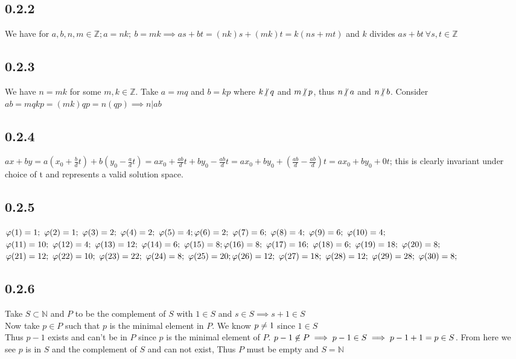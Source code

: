 \documentclass[11pt]{article}
\begin{document}
	\subsection*{0.2.2}
		We have for $a, b, n, m \in \mathbb{Z}; a = nk;\ b = mk \implies as + bt = (nk)s + (mk)t = k(ns + mt)$ and $k$ divides $as + bt \ \forall s,t \in \mathbb{Z}$
	\subsection*{0.2.3}
		We have $n = mk$ for some $m, k \in \mathbb{Z}$.  Take $a = mq$ and $b = kp$ where $k \centernot | q$ and $m \centernot | p$, thus $n \centernot | a$ and
		$n \centernot | b$.  Consider $ab = mqkp = (mk)qp = n(qp) \implies n | ab$
	\subsection*{0.2.4}
		$ax + by = a(x_0 + \frac{b}{d}t) + b(y_0 - \frac{a}{d}t) = ax_0 + \frac{ab}{d}t + by_0 - \frac{ab}{d}t = ax_0 + by_0 + (\frac{ab}{d} - \frac{ab}{d})t = ax_0 + by_0 + 			0t$; this is clearly invariant under choice of t and represents a valid solution space.
	\subsection*{0.2.5}
		$\varphi(1)=1;\ \varphi(2)=1;\ \varphi(3)=2;\ \varphi(4)=2;\ \varphi(5)=4;\\ \varphi(6)=2;\ \varphi(7)=6;\ \varphi(8)=4;\ \varphi(9)=6;\ \varphi(10)=4;$	\\
		$\varphi(11)=10;\ \varphi(12)=4;\ \varphi(13)=12;\ \varphi(14)=6;\ \varphi(15)=8;\\ \varphi(16)=8;\ \varphi(17)=16;\ \varphi(18)=6;\ \varphi(19)=18;\ \varphi(20)=8;$	\\
		$\varphi(21)=12;\ \varphi(22)=10;\ \varphi(23)=22;\ \varphi(24)=8;\ \varphi(25)=20;\\ \varphi(26)=12;\ \varphi(27)=18;\ \varphi(28)=12;\ \varphi(29)=28;\ \varphi(30)=8;$
	\subsection*{0.2.6}
		Take $S \subset \mathbb{N}$ and $P$ to be the complement of $S$ with $1 \in S$ and $s \in S \implies s+1 \in S$\\
		Now take $p \in P$ such that $p$ is the minimal element in $P$.  We know $p \centernot = 1$ since $1 \in S$\\
		Thus $p - 1$ exists and can't be in $P$ since $p$ is the minimal element of $P$.  $p -  1 \centernot \in P \implies
		p - 1 \in S \implies p - 1 + 1 = p \in S$.  From here we see $p$ is in $S$ and the complement of $S$ and can not exist,
		Thus $P$ must be empty and $S = \mathbb{N}$
\end{document}
